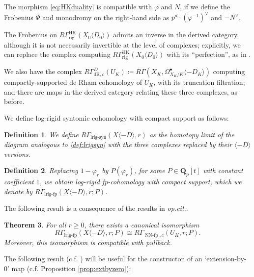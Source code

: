 \documentclass[cjm]{ipart}
\theoremstyle{plain}
\newtheorem{theorem}{Theorem}[subsection]
\newtheorem{definition}[theorem]{Definition}
\theoremstyle{remark}
\DeclareMathOperator{\HK}{HK}
\DeclareMathOperator{\lrigfp}{lrig-fp}
\DeclareMathOperator{\lrigsyn}{lrig-syn}
\DeclareMathOperator{\NNfp}{NN-fp}
\newcommand{\QQ}{\mathbf{Q}}
\newcommand{\Qp}{\QQ_p}
\newcommand{\dR}{\mathrm{dR}}
\newcommand{\rig}{\mathrm{rig}}
\numberwithin{equation}{subsection}
\renewcommand{\geq}{\geqslant}
\begin{document}
  \begin{note}\label{note:Frobholo}
   The morphism \eqref{eq:HKduality} is compatible with $\varphi$ and $N$, if we define the Frobenius $\Phi$ and monodromy on the right-hand side as $p^d \cdot (\varphi^{-1})^\vee$ and $-N^\vee$.
  \end{note}

  \begin{remark}
    The Frobenius on $R\Gamma^{\HK}_{\rig}(X_0 \langle D_0\rangle)$ admits an inverse in the derived category, although it is not necessarily invertible at the level of complexes; explicitly, we can replace the complex computing $R\Gamma^{\HK}_{\rig}(X_0 \langle D_0\rangle)$ with its ``perfection'', as in \cite[\S 4]{besser12}.
   \end{remark}

  We also have the complex $R\Gamma^D_{\dR,c}(U_K) \coloneqq R\Gamma(X_K, \Omega^\bullet_{X_K/K}\langle -D_K\rangle)$ computing compactly-suppor\-ted de Rham cohomology of $U_K$, with its truncation filtration; and there are maps in the derived category relating these three complexes, as before.

 We define log-rigid syntomic cohomology with compact support as follows:

 \begin{definition}\label{def:lrigsyncompact}
  We define $R\Gamma_{\lrigsyn}(X\langle -D\rangle,r)$ as the homotopy limit of the diagram analogous to \cref{def:lrigsyn} with the three complexes replaced by their $\langle-D\rangle$ versions.
 \end{definition}

 \begin{definition}
  Replacing $1-\varphi_r$ by $P(\varphi_r)$, for some $P \in \Qp[t]$ with constant coefficient $1$, we obtain log-rigid fp-cohomology with compact support, which we denote by $R\Gamma_{\lrigfp}(X\langle -D\rangle, r; P)$.
 \end{definition}

 The following result is a consequence of the results in \emph{op.cit.}.

 \begin{theorem}\label{thm:comparisonc}
  For all $r\geq 0$, there exists a canonical isomorphism
  \[ R\Gamma_{\lrigfp}(X\langle -D \rangle, r; P)\cong R\Gamma_{\NNfp,c}(U_K, r; P).\]
  Moreover, this isomorphism is compatible with pullback.
 \end{theorem}

 The following result (c.f. \cite[\S 4]{besser12}) will be useful for the constructon of an `extension-by-0' map (c.f. Proposition \ref{prop:extbyzero}):
\end{document}
